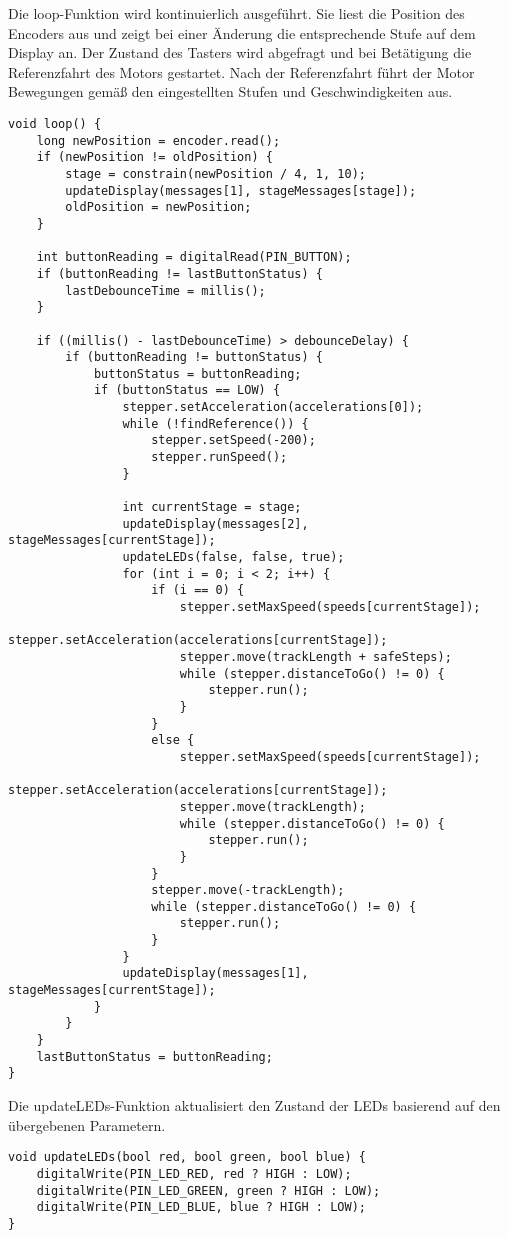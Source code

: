 Die loop-Funktion wird kontinuierlich ausgeführt. Sie liest die Position des Encoders aus und zeigt bei einer Änderung die entsprechende Stufe auf dem Display an. Der Zustand des Tasters wird abgefragt und bei Betätigung die Referenzfahrt des Motors gestartet. Nach der Referenzfahrt führt der Motor Bewegungen gemäß den eingestellten Stufen und Geschwindigkeiten aus.

\begin{lstlisting}
void loop() {
	long newPosition = encoder.read();
	if (newPosition != oldPosition) {
		stage = constrain(newPosition / 4, 1, 10);
		updateDisplay(messages[1], stageMessages[stage]);
		oldPosition = newPosition;
	}
	
	int buttonReading = digitalRead(PIN_BUTTON);
	if (buttonReading != lastButtonStatus) {
		lastDebounceTime = millis();
	}
	
	if ((millis() - lastDebounceTime) > debounceDelay) {
		if (buttonReading != buttonStatus) {
			buttonStatus = buttonReading;
			if (buttonStatus == LOW) {
				stepper.setAcceleration(accelerations[0]);
				while (!findReference()) {
					stepper.setSpeed(-200);
					stepper.runSpeed();
				}
				
				int currentStage = stage;
				updateDisplay(messages[2], stageMessages[currentStage]);
				updateLEDs(false, false, true);
				for (int i = 0; i < 2; i++) {
					if (i == 0) {
						stepper.setMaxSpeed(speeds[currentStage]);
						stepper.setAcceleration(accelerations[currentStage]);
						stepper.move(trackLength + safeSteps);
						while (stepper.distanceToGo() != 0) {
							stepper.run();
						}
					}
					else {
						stepper.setMaxSpeed(speeds[currentStage]);
						stepper.setAcceleration(accelerations[currentStage]);
						stepper.move(trackLength);
						while (stepper.distanceToGo() != 0) {
							stepper.run();
						}
					}
					stepper.move(-trackLength);
					while (stepper.distanceToGo() != 0) {
						stepper.run();
					}
				}
				updateDisplay(messages[1], stageMessages[currentStage]);
			}
		}
	}
	lastButtonStatus = buttonReading;
}
\end{lstlisting}

Die updateLEDs-Funktion aktualisiert den Zustand der LEDs basierend auf den übergebenen Parametern.

\begin{lstlisting}
void updateLEDs(bool red, bool green, bool blue) {
	digitalWrite(PIN_LED_RED, red ? HIGH : LOW);
	digitalWrite(PIN_LED_GREEN, green ? HIGH : LOW);
	digitalWrite(PIN_LED_BLUE, blue ? HIGH : LOW);
}
\end{lstlisting}

